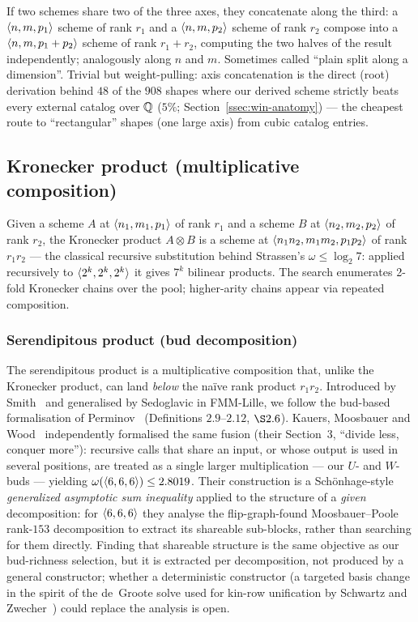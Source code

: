 If two schemes share two of the three axes, they concatenate along the third: a
\(\langle n, m, p_1 \rangle\) scheme of rank \(r_1\) and a \(\langle n, m, p_2 \rangle\) scheme of
rank \(r_2\) compose into a \(\langle n, m, p_1 + p_2 \rangle\) scheme of rank \(r_1 + r_2\),
computing the two halves of the result independently; analogously along \(n\) and \(m\).
Sometimes called ``plain split along a dimension''. Trivial but weight-pulling: axis
concatenation is the direct (root) derivation behind \(48\) of the \(908\) shapes where our
derived scheme strictly beats every external catalog over \(\mathbb{Q}\) (\(5\%\);
Section~\ref{ssec:win-anatomy}) --- the cheapest route to ``rectangular'' shapes (one large
axis) from cubic catalog entries.

\subsection{Kronecker product (multiplicative composition)}
\label{ssec:kronecker}

Given a scheme \(A\) at \(\langle n_1, m_1, p_1 \rangle\) of rank \(r_1\) and a scheme \(B\) at
\(\langle n_2, m_2, p_2 \rangle\) of rank \(r_2\), the Kronecker product \(A \otimes B\) is a
scheme at \(\langle n_1 n_2, m_1 m_2, p_1 p_2 \rangle\) of rank \(r_1 r_2\) --- the classical
recursive substitution behind Strassen's \(\omega \le \log_2 7\): applied recursively to
\(\langle 2^k, 2^k, 2^k \rangle\) it gives \(7^k\) bilinear products. The search enumerates
2-fold Kronecker chains over the pool; higher-arity chains appear via repeated composition.

\subsubsection{Serendipitous product (bud decomposition)}
\label{ssec:serendipitous}

The serendipitous product is a multiplicative composition that, unlike the Kronecker
product, can land \emph{below} the naïve rank product \(r_1 r_2\). Introduced by
Smith~\cite{smith2002fast} and generalised by Sedoglavic in FMM-Lille, we follow the bud-based
formalisation of Perminov~\cite{perminov2026serendipitous} (Definitions \(2.9\)--\(2.12\),
\(\S 2.6\)). Kauers, Moosbauer and Wood~\cite{kauersmoosbauerwood2026} independently
formalised the same fusion (their Section~3, ``divide less, conquer more''): recursive calls
that share an input, or whose output is used in several positions, are treated as a single
larger multiplication --- our \(U\)- and \(W\)-buds --- yielding
\(\omega(\langle 6, 6, 6 \rangle) \le 2.8019\). Their construction is a Sch\"onhage-style
\emph{generalized asymptotic sum inequality} applied to the structure of a \emph{given}
decomposition: for \(\langle 6, 6, 6 \rangle\) they analyse the flip-graph-found Moosbauer--Poole
rank-\(153\) decomposition to extract its shareable sub-blocks, rather than searching for
them directly. Finding that shareable structure is the same objective as our bud-richness
selection, but it is extracted per decomposition, not produced by a general constructor;
whether a deterministic constructor (a targeted basis change in the spirit of the de~Groote
solve used for kin-row unification by Schwartz and Zwecher~\cite{schwartzzwecher2025}) could
replace the analysis is open.


